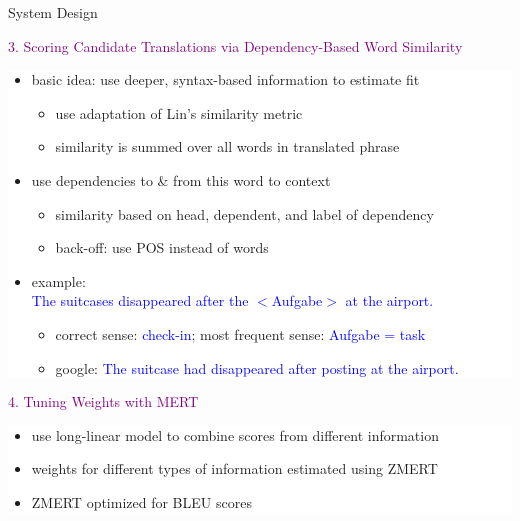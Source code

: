 \documentclass[final,t]{beamer}
\begin{document}
\begin{frame}{}
\begin{columns}[t]
\begin{column}{.47\linewidth}
\begin{block}{System Design}


\begin{center}
  \textcolor{purple}{3. Scoring Candidate Translations via Dependency-Based Word Similarity}
\end{center}

  \colorbox{white}{
\begin{minipage}{.90\linewidth}
  \begin{itemize}
  \item basic idea: use deeper, syntax-based information to estimate fit
    \begin{itemize}
    \item use adaptation of Lin's similarity metric
    \item similarity is summed over all words in translated phrase
    \end{itemize}
  \item use dependencies to \& from this word to context
    \begin{itemize}
    \item similarity based on head, dependent, and label of dependency 
    \item back-off: use POS instead of words
    \end{itemize}
  \item example: \\
    \textcolor{blue}{The suitcases disappeared after the $<$Aufgabe$>$ at the airport.}
    \begin{itemize}
    \item correct sense: \textcolor{blue}{check-in}; most frequent sense: \textcolor{blue}{Aufgabe = task}\\
    \item google: \textcolor{blue}{The suitcase had disappeared after posting at the airport.}
    \end{itemize}      
  \end{itemize}
\end{minipage}
}
\vspace{1cm}

\begin{center}
  \textcolor{purple}{4. Tuning Weights with MERT}
\end{center}

  \colorbox{white}{
\begin{minipage}{.90\linewidth}
  \begin{itemize}
  \item use long-linear model to combine scores from different information
  \item weights for different types of information estimated using ZMERT
  \item ZMERT optimized for BLEU scores
  \end{itemize}
\end{minipage}
}


\end{block}
\end{column}
\end{columns}
\end{frame}
\end{document}
